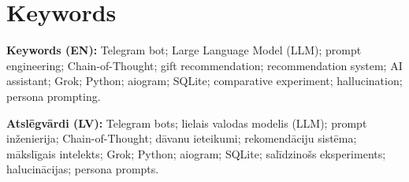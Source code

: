 \chapter*{Keywords}

\textbf{Keywords (EN):} Telegram bot; Large Language Model (LLM); prompt engineering; Chain-of-Thought; gift recommendation; recommendation system; AI assistant; Grok; Python; aiogram; SQLite; comparative experiment; hallucination; persona prompting.

\textbf{Atslēgvārdi (LV):} Telegram bots; lielais valodas modelis (LLM); prompt inženierija; Chain-of-Thought; dāvanu ieteikumi; rekomendāciju sistēma; m\=ak\-sl\=igais intelekts; Grok; Python; aiogram; SQLite; sal\=idzinošs eksperiments; halucin\=acijas; persona prompts.
